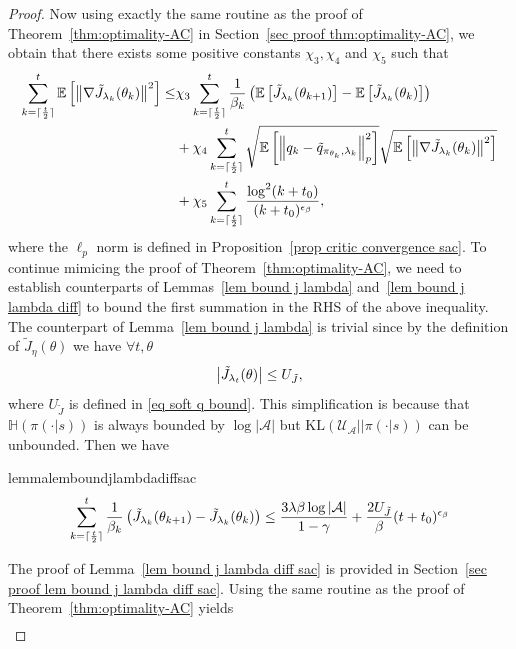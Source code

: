 \documentclass[twoside,11pt]{article}
\DeclarePairedDelimiter{\ceil}{\lceil}{\rceil}
\newcommand{\fA}{\mathcal{A}}
\newcommand{\fU}{\mathcal{U}}
\newcommand{\E}{\mathbb{E}}
\newcommand{\na}{{|\fA|}}
\newcommand{\kl}[2]{\text{KL}\left(#1||#2\right)}
\newcommand{\ent}[1]{\mathbb{H}\left(#1\right)}
\numberwithin{assucounter}{section}
\begin{document}
\begin{proof}
Now using exactly the same routine as the proof of Theorem~\ref{thm:optimality-AC} in Section~\ref{sec proof thm:optimality-AC},
we obtain that there exists some positive constants $\chi_3, \chi_4$ and $\chi_5$ such that
\begin{align}
  \sum_{k=\ceil{\frac{t}{2}}}^t \E\left[\norm{\nabla \tilde J_{\lambda_k}(\theta_k)}^2\right] \leq& \chi_3 \sum_{k=\ceil{\frac{t}{2}}}^t \frac{1}{\beta_k} \left(\E\left[\tilde J_{\lambda_k}(\theta_{k+1})\right] - \E\left[\tilde J_{\lambda_k}(\theta_k)\right]\right) \\
  &+ \chi_4 \sum_{k=\ceil{\frac{t}{2}}}^t \sqrt{\E\left[\norm{q_k - \tilde q_{\pi_{\theta_k}, \lambda_k}}_p^2 \right]} \sqrt{\E\left[\norm{\nabla \tilde J_{\lambda_k}(\theta_k)}^2\right]} \\
  &+ \chi_5 \sum_{k=\ceil{\frac{t}{2}}}^t \frac{\log^2(k+t_0)}{(k+t_0)^{\epsilon_\beta}},
\end{align}
where the $\ell_p$ norm is defined in Proposition~\ref{prop critic convergence sac}.
To continue mimicing the proof of Theorem~\ref{thm:optimality-AC},
we need to establish counterparts of Lemmas~\ref{lem bound j lambda} and~\ref{lem bound j lambda diff} to bound the first summation in the RHS of the above inequality.
The counterpart of Lemma~\ref{lem bound j lambda} is trivial since 
by the definition of $\tilde J_\eta(\theta)$ we have $\forall t, \theta$
\begin{align}
  \abs{\tilde J_{\lambda_t}(\theta)} \leq U_{\tilde J},
\end{align}
where $U_{\tilde J}$ is defined in \eqref{eq soft q bound}.
This simplification is because that $\ent{\pi(\cdot|s)}$ is always bounded by $\log \na$ but $\kl{\fU_{\fA}}{\pi(\cdot|s)}$ can be unbounded.
Then we have
\begin{restatable}{lemma}{lemboundjlambdadiffsac}
  \label{lem bound j lambda diff sac}
  \begin{align}
  \sum_{k=\ceil{\frac{t}{2}}}^t \frac{1}{\beta_k}\left(\tilde J_{\lambda_k}(\theta_{k+1}) - \tilde J_{\lambda_k}(\theta_k) \right) \leq \frac{3\lambda\beta \log \na}{1-\gamma} + \frac{2U_{\tilde J}}{\beta} (t+t_0)^{\epsilon_\beta}
  \end{align}
\end{restatable}
\noindent The proof of Lemma~\ref{lem bound j lambda diff sac} is provided in Section~\ref{sec proof lem bound j lambda diff sac}.
Using the same routine as the proof of Theorem~\ref{thm:optimality-AC} yields
\begin{align}
  \label{eq actor convergence stationary points sac}

\end{align}
\end{proof}
\end{document}

